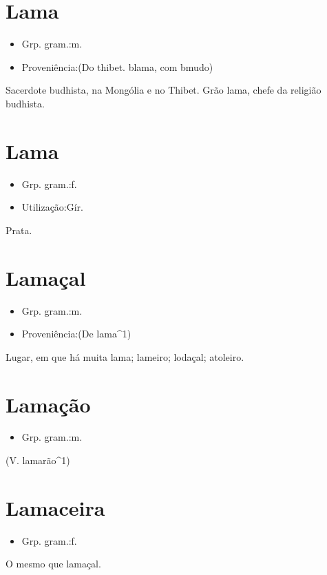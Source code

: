 \section{Lama}
\begin{itemize}
\item {Grp. gram.:m.}
\end{itemize}
\begin{itemize}
\item {Proveniência:(Do thibet. \textunderscore blama\textunderscore , com \textunderscore b\textunderscore  mudo)}
\end{itemize}
Sacerdote budhista, na Mongólia e no Thibet.
\textunderscore Grão lama\textunderscore , chefe da religião budhista.
\section{Lama}
\begin{itemize}
\item {Grp. gram.:f.}
\end{itemize}
\begin{itemize}
\item {Utilização:Gír.}
\end{itemize}
Prata.
\section{Lamaçal}
\begin{itemize}
\item {Grp. gram.:m.}
\end{itemize}
\begin{itemize}
\item {Proveniência:(De \textunderscore lama\textunderscore ^1)}
\end{itemize}
Lugar, em que há muita lama; lameiro; lodaçal; atoleiro.
\section{Lamação}
\begin{itemize}
\item {Grp. gram.:m.}
\end{itemize}
(V. \textunderscore lamarão\textunderscore ^1)
\section{Lamaceira}
\begin{itemize}
\item {Grp. gram.:f.}
\end{itemize}
O mesmo que \textunderscore lamaçal\textunderscore .
